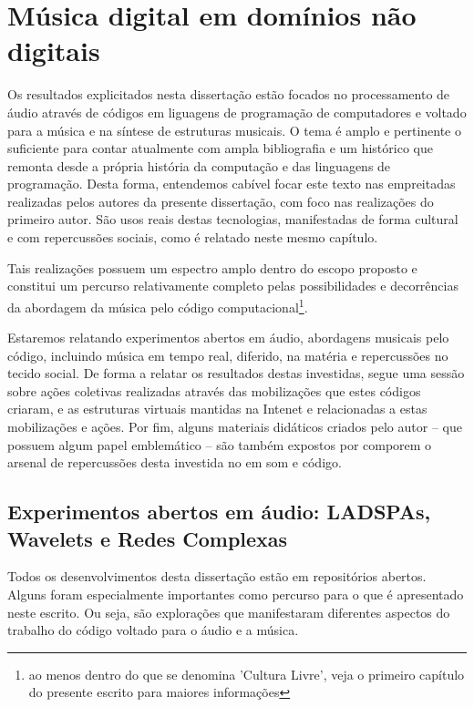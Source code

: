 \chapter{Música digital em domínios não digitais}
\label{cap:musicaExtra}

Os resultados explicitados nesta dissertação estão focados no
processamento de áudio através de códigos em liguagens de programação
de computadores e voltado para a música e na síntese de estruturas
musicais. O tema é amplo e pertinente o suficiente para contar
atualmente com ampla bibliografia e um histórico que remonta desde a
própria história da computação e das linguagens de programação.  Desta
forma, entendemos cabível focar este texto nas empreitadas realizadas
pelos autores da presente dissertação, com foco nas realizações do
primeiro autor. São usos reais destas tecnologias, manifestadas de
forma cultural e com repercussões sociais, como é relatado neste mesmo
capítulo.

Tais realizações possuem um espectro amplo dentro do escopo proposto e
constitui um percurso relativamente completo pelas possibilidades e
decorrências da abordagem da música pelo código
computacional\footnote{ao menos dentro do que se denomina 'Cultura Livre',
  veja o primeiro capítulo do presente escrito para maiores
  informações}.

Estaremos relatando experimentos abertos em áudio, abordagens musicais
pelo código, incluindo música em tempo real, diferido, na matéria e
repercussões no tecido social. De forma a relatar os resultados destas
investidas, segue uma sessão sobre ações coletivas realizadas através
das mobilizações que estes códigos criaram, e as estruturas virtuais
mantidas na Intenet e relacionadas a estas mobilizações e ações. Por
fim, alguns materiais didáticos criados pelo autor -- que possuem
algum papel emblemático -- são também expostos por comporem o arsenal
de repercussões desta investida no em som e código.

\section{Experimentos abertos em áudio: LADSPAs, Wavelets e Redes Complexas}

Todos os desenvolvimentos desta dissertação estão em repositórios
abertos\cite{repositorios-tese-dev}.  Alguns foram especialmente
importantes como percurso para o que é apresentado neste escrito. Ou
seja, são explorações que manifestaram diferentes aspectos do trabalho
do código voltado para o áudio e a música.

